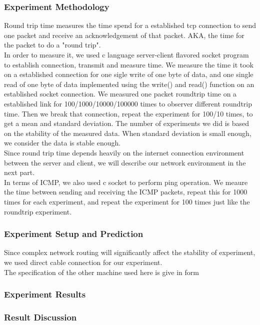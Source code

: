 \documentclass{article} %
\begin{document}
\subsubsection{Experiment Methodology}
Round trip time measures the time spend for a established tcp connection to send one packet and receive an acknowledgement of that packet. AKA, the time for the packet to do a "round trip".\\
In order to measure it, we used c language server-client flavored socket program to establish connection, transmit and measure time. We measure the time it took on a established connection for one sigle write of one byte of data, and one single read of one byte of data implemented using the write() and read() function on an established socket connection. We measured one packet roundtrip time on a established link for 100/1000/10000/100000 times to observer different roundtrip time. Then we break that connection, repeat the experiment for 100/10 times, to get a mean and standard deviation. The number of experiments we did is based on the stability of the measured data. When standard deviation is small enough, we consider the data is stable enough.\\
Since round trip time depends heavily on the internet connection environment between the server and client, we will describe our network environment in the next part. \\
In terms of ICMP, we also used c socket to perform ping operation. We meaure the time between sending and receiving the ICMP packets, repeat this for 1000 times for each experiment, and repeat the experiment for 100 times just like the roundtrip experiment. \\
\subsubsection{Experiment Setup and Prediction}
Since complex network routing will significantly affect the stability of experiment, we used direct cable connection for our experiment. \\
The specification of the other machine used here is give in form \\ %


\subsubsection{Experiment Results}
\subsubsection{Result Discussion}
\end{document}
